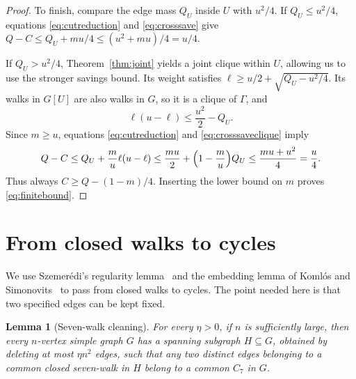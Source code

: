\documentclass[10pt]{article}
\newtheorem{lem}[thm]{Lemma}
\theoremstyle{remark}
\begin{document}
\begin{proof}
To finish, compare the edge mass $Q_U$ inside $U$ with $u^2/4$. If $Q_U\le u^2/4$, equations \eqref{eq:cutreduction} and \eqref{eq:crosssave} give $Q-C\le Q_U+mu/4\le(u^2+mu)/4=u/4$.

If $Q_U>u^2/4$, Theorem~\ref{thm:joint} yields a joint clique within $U$, allowing us to use the stronger savings bound. Its weight satisfies $\ell\ge u/2+\sqrt{Q_U-u^2/4}$. Its walks in $G[U]$ are also walks in $G$, so it is a clique of $\Gamma$, and
\[
 \ell(u-\ell)\le\frac{u^2}{2}-Q_U.
\]
Since $m\ge u$, equations \eqref{eq:cutreduction} and \eqref{eq:crosssaveclique} imply
\[
 Q-C\le Q_U+\frac m u\ell(u-\ell)
 \le\frac{mu}{2}+\Bigl(1-\frac m u\Bigr)Q_U
 \le\frac{mu+u^2}{4}=\frac u4.
\]
Thus always $C\ge Q-(1-m)/4$. Inserting the lower bound on $m$ proves \eqref{eq:finitebound}.
\end{proof}

\section{From closed walks to cycles}\label{sec:cleaning}

We use Szemer\'{e}di's regularity lemma~\cite{Szemeredi} and the embedding lemma of Koml\'{o}s and Simonovits~\cite[Theorem~2.1]{KS} to pass from closed walks to cycles. The point needed here is that two specified edges can be kept fixed.

\begin{lem}[Seven-walk cleaning]\label{lem:cleaning}
For every $\eta>0$, if $n$ is sufficiently large, then every $n$-vertex simple graph $G$ has a spanning subgraph $H\subseteq G$, obtained by deleting at most $\eta n^2$ edges, such that any two distinct edges belonging to a common closed seven-walk in $H$ belong to a common $C_7$ in $G$.
\end{lem}
\end{document}
